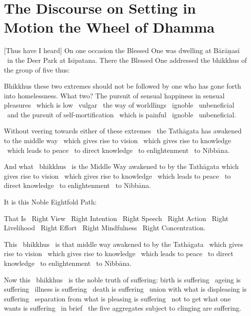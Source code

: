 \section{The Discourse on Setting in Motion the Wheel of Dhamma}
\label{wheel-of-dhamma-full}

[Thus have I heard] On one occasion the Blessed One was dwelling at Bārāṇasī \breathmark\ in the Deer Park at Isipatana. There the Blessed One addressed the bhikkhus of the group of five thus:

Bhikkhus these two extremes should not be followed by one who has gone forth into homelessness. What two? The pursuit of sensual happiness in sensual pleasures \breathmark\ which is low \breathmark\ vulgar \breathmark\ the way of worldlings \breathmark\ ignoble \breathmark\ unbeneficial \breathmark\ and the pursuit of self-mortification \breathmark\ which is painful \breathmark\ ignoble \breathmark\ unbeneficial.

Without veering towards either of these extremes \breathmark\ the Tathāgata has awakened to the middle way \breathmark\ which gives rise to vision \breathmark\ which gives rise to knowledge \breathmark\ which leads to peace \breathmark\ to direct knowledge \breathmark\ to enlightenment \breathmark\ to Nibbāna.

And what \breathmark\ bhikkhus \breathmark\ is the Middle Way awakened to by the Tathāgata which gives rise to vision \breathmark\ which gives rise to knowledge \breathmark\ which leads to peace \breathmark\ to direct knowledge \breathmark\ to enlightenment \breathmark\ to Nibbāna.

It is this Noble Eightfold Path:

That Is \breathmark\ Right View \breathmark\ Right Intention \breathmark\ Right Speech \breathmark\ Right Action \breathmark\ Right Livelihood \breathmark\ Right Effort \breathmark\ Right Mindfulness \breathmark\ Right Concentration.

This \breathmark\ bhikkhus \breathmark\ is that middle way awakened to by the Tathāgata \breathmark\ which gives rise to vision \breathmark\ which gives rise to knowledge \breathmark\ which leads to peace \breathmark\ to direct knowledge \breathmark\ to enlightenment \breathmark\ to Nibbāna.

Now this \breathmark\ bhikkhus \breathmark\ is the noble truth of suffering: birth is suffering \breathmark\ ageing is suffering \breathmark\ illness is suffering \breathmark\ death is suffering \breathmark\ union with what is displeasing is suffering \breathmark\ separation from what is pleasing is suffering \breathmark\ not to get what one wants is suffering \breathmark\ in brief \breathmark\ the five aggregates subject to clinging are suffering.

